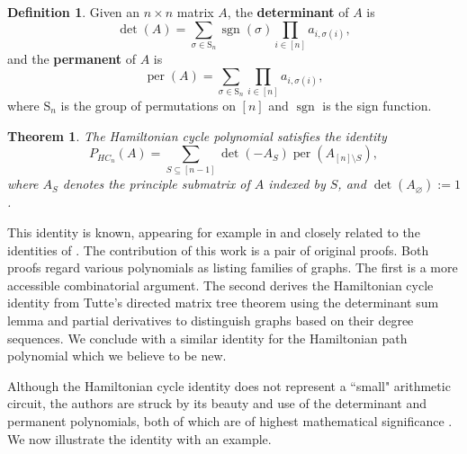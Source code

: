 \documentclass{article}
\newcommand{\per}{\operatorname{per}}
\newcommand{\sgn}{\operatorname{sgn}}
\newcommand{\Sn}{{\text{S}_n}}
\theoremstyle{theorem}
\newtheorem*{thm*}{Theorem}
\theoremstyle{definition}
\newtheorem{defn}[thm]{Definition}
\begin{document}
\begin{defn}
    Given an $n\times n$ matrix $A$, the \textbf{determinant} of $A$ is
    \[  
        \det(A)=\sum_{\sigma\in\Sn}\sgn(\sigma)\prod_{i\in[n]}a_{i,\sigma(i)},
    \]
    and the \textbf{permanent} of $A$ is
    \[
        \per(A)=\sum_{\sigma\in\Sn}\prod_{i\in[n]}a_{i,\sigma(i)},
    \]
    where $\Sn$ is the group of permutations on $[n]$ and $\sgn$ is the sign function.
\end{defn}

\begin{thm*}
    The Hamiltonian cycle polynomial satisfies the identity
    \[
        P_{HC_n}(A)=\sum_{S\subseteq [n-1]}\det(-A_S)\per(A_{[n]\setminus S}),
    \]
    where $A_S$ denotes the principle submatrix of $A$ indexed by $S$, and $\det(A_{\varnothing}):=1$.
\end{thm*}

This identity is known, appearing for example in \cite{kne20} and closely related to the identities of \cite{koh77, kar82, bax93}. The contribution of this work is a pair of original proofs. Both proofs regard various polynomials as listing families of graphs. The first is a more accessible combinatorial argument. The second derives the Hamiltonian cycle identity from Tutte's directed matrix tree theorem using the determinant sum lemma and partial derivatives to distinguish graphs based on their degree sequences. We conclude with a similar identity for the Hamiltonian path polynomial which we believe to be new.

Although the Hamiltonian cycle identity does not represent a ``small" arithmetic circuit, the authors are struck by its beauty and use of the determinant and permanent polynomials, both of which are of highest mathematical significance \cite{val79a,val79b}. We now illustrate the identity with an example.
\end{document}
